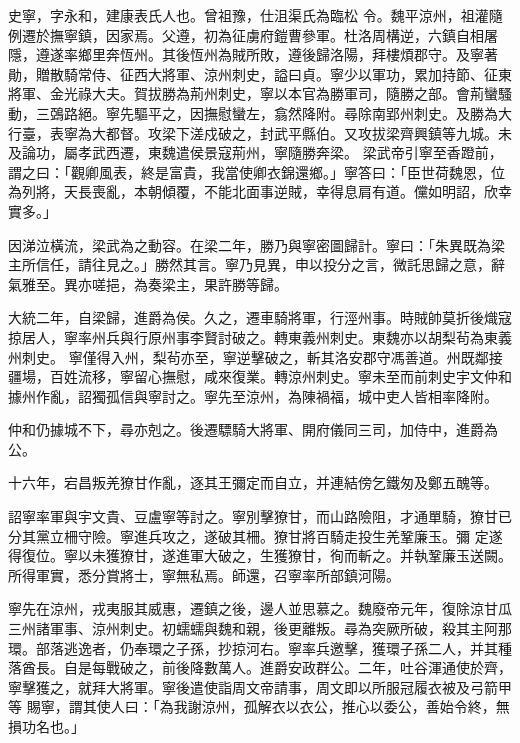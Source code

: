 \begin{pinyinscope}
 史寧，字永和，建康表氏人也。曾祖豫，仕沮渠氏為臨松
 令。魏平涼州，祖灌隨例遷於撫寧鎮，因家焉。父遵，初為征虜府鎧曹參軍。杜洛周構逆，六鎮自相屠隱，遵遂率鄉里奔恆州。其後恆州為賊所敗，遵後歸洛陽，拜樓煩郡守。及寧著勛，贈散騎常侍、征西大將軍、涼州刺史，謚曰貞。寧少以軍功，累加持節、征東將軍、金光祿大夫。賀拔勝為荊州刺史，寧以本官為勝軍司，隨勝之部。會荊蠻騷動，三鵶路絕。寧先驅平之，因撫慰蠻左，翕然降附。尋除南郢州刺史。及勝為大行臺，表寧為大都督。攻梁下溠戍破之，封武平縣伯。又攻拔梁齊興鎮等九城。未及論功，屬孝武西遷，東魏遣侯景寇荊州，寧隨勝奔梁。
 梁武帝引寧至香蹬前，謂之曰：「觀卿風表，終是富貴，我當使卿衣錦還鄉。」寧答曰：「臣世荷魏恩，位為列將，天長喪亂，本朝傾覆，不能北面事逆賊，幸得息肩有道。儻如明詔，欣幸實多。」



 因涕泣橫流，梁武為之動容。在梁二年，勝乃與寧密圖歸計。寧曰：「朱異既為梁主所信任，請往見之。」勝然其言。寧乃見異，申以投分之言，微託思歸之意，辭氣雅至。異亦嗟挹，為奏梁主，果許勝等歸。



 大統二年，自梁歸，進爵為侯。久之，遷車騎將軍，行涇州事。時賊帥莫折後熾寇掠居人，寧率州兵與行原州事李賢討破之。轉東義州刺史。東魏亦以胡梨茍為東義州刺史。
 寧僅得入州，梨茍亦至，寧逆擊破之，斬其洛安郡守馮善道。州既鄰接疆場，百姓流移，寧留心撫慰，咸來復業。轉涼州刺史。寧未至而前刺史宇文仲和據州作亂，詔獨孤信與寧討之。寧先至涼州，為陳禍福，城中吏人皆相率降附。



 仲和仍據城不下，尋亦剋之。後遷驃騎大將軍、開府儀同三司，加侍中，進爵為公。



 十六年，宕昌叛羌獠甘作亂，逐其王彌定而自立，并連結傍乞鐵匆及鄭五醜等。



 詔寧率軍與宇文貴、豆盧寧等討之。寧別擊獠甘，而山路險阻，才通單騎，獠甘已分其黨立柵守險。寧進兵攻之，遂破其柵。獠甘將百騎走投生羌鞏廉玉。彌
 定遂得復位。寧以未獲獠甘，遂進軍大破之，生獲獠甘，徇而斬之。并執鞏廉玉送闕。所得軍實，悉分賞將士，寧無私焉。師還，召寧率所部鎮河陽。



 寧先在涼州，戎夷服其威惠，遷鎮之後，邊人並思慕之。魏廢帝元年，復除涼甘瓜三州諸軍事、涼州刺史。初蠕蠕與魏和親，後更離叛。尋為突厥所破，殺其主阿那環。部落逃逸者，仍奉環之子孫，抄掠河右。寧率兵邀擊，獲環子孫二人，并其種落酋長。自是每戰破之，前後降數萬人。進爵安政群公。二年，吐谷渾通使於齊，寧擊獲之，就拜大將軍。寧後遣使詣周文帝請事，周文即以所服冠履衣被及弓箭甲等
 賜寧，謂其使人曰：「為我謝涼州，孤解衣以衣公，推心以委公，善始令終，無損功名也。」




\end{pinyinscope}
